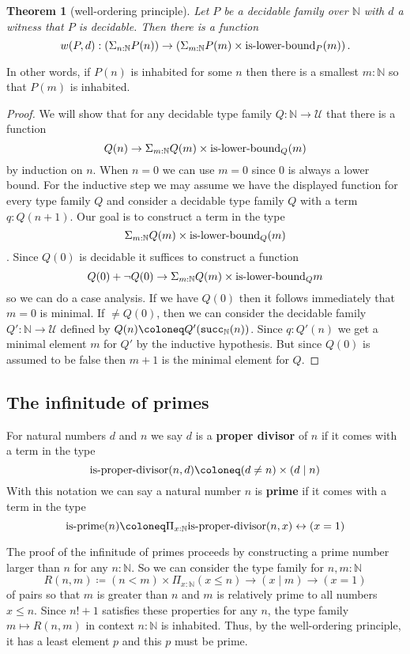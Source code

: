 \documentclass{amsart}
\theoremstyle{theorem}
\newtheorem*{thm}{Theorem}
\theoremstyle{definition}
\theoremstyle{remark}
\newcommand{\0}{\mathbbe{0}}
\newcommand{\1}{\mathbbe{1}}
\newcommand{\2}{\mathbbe{2}}
\newcommand{\3}{\mathbbe{3}}
\newcommand{\4}{\mathbbe{4}}
\newcommand{\term}[1]{{\textup{\texttt{#1}}}}
\newcommand{\type}[1]{{\textup{#1}}}
\newcommand{\bN}{{\mathbb{N}}}
\newcommand{\suc}{\term{succ}_{\bN}}
\newcommand{\UU}{{\mathcal{U}}}
\begin{document}
  \begin{thm}[well-ordering principle]
    Let $P$ be a decidable family over $\bN$ with $d$ a witness that $P$ is decidable. Then there is a function
    \[ w(P,d) : \left( \Sigma_{n : \bN}P(n)\right) \to \left( \Sigma_{m : \bN}P(m) \times \type{is-lower-bound}_P(m)\right).\]
  \end{thm}
  In other words, if $P(n)$ is inhabited for some $n$ then there is a smallest $m : \bN$ so that $P(m)$ is inhabited.

  \begin{proof}
    We will show that for any decidable type family $Q : \bN \to \UU$ that there is a function
    \[ Q(n) \to \Sigma_{m : \bN}Q(m) \times \type{is-lower-bound}_Q(m)
    \]
    by induction on $n$. When $n=0$ we can use $m=0$ since 0 is always a lower bound. For the inductive step we may assume we have the displayed function for every type family $Q$ and consider a decidable type family $Q$ with a term $q : Q(n+1)$. Our goal is to construct a term in the type
    \[ \Sigma_{m : \bN}Q(m) \times \type{is-lower-bound}_{Q}(m)\]. Since $Q(0)$ is decidable it suffices to construct a function
    \[ Q(0) + \neg Q(0) \to  \Sigma_{m : \bN}Q(m) \times \type{is-lower-bound}_{Q}m
    \]
    so we can do a case analysis. If we have $Q(0)$ then it follows immediately that $m=0$ is minimal.  If $\neq Q(0)$, then we can consider the decidable family $Q' \colon \bN \to \UU$ defined by $Q(n) \coloneq Q'(\suc(n))$. Since $q : Q'(n)$ we get a minimal element $m$ for $Q'$ by the inductive hypothesis. But since $Q(0)$ is assumed to be false then $m+1$ is the minimal element for $Q$.   
    \end{proof}
    
  

\subsection*{The infinitude of primes}  

For natural numbers $d$ and $n$ we say $d$ is a \textbf{proper divisor} of $n$ if it comes with a term in the type
\[ \type{is-proper-divisor}(n,d) \coloneq (d \neq n) \times (d \mid n)\]
With this notation we can say a natural number $n$ is \textbf{prime} if it comes with a term in the type
\[ \type{is-prime}(n) \coloneq \Pi_{x : \bN}\type{is-proper-divisor}(n,x) \leftrightarrow (x=1)\]

The proof of the infinitude of primes proceeds by constructing a prime number larger than $n$ for any $n : \bN$. So we can consider the type family for $n,m : \bN$
\[ R(n,m) \coloneq (n < m) \times \Pi_{x : \bN} (x \leq n) \to (x \mid m) \to (x=1)\]
of pairs so that $m$ is greater than $n$ and $m$ is relatively prime to all numbers $x \leq n$. Since $n!+1$ satisfies these properties for any $n$, the type family $m \mapsto R(n,m)$ in context $n : \bN$ is inhabited. Thus, by the well-ordering principle, it has a least element $p$ and this $p$ must be prime.
\end{document}
